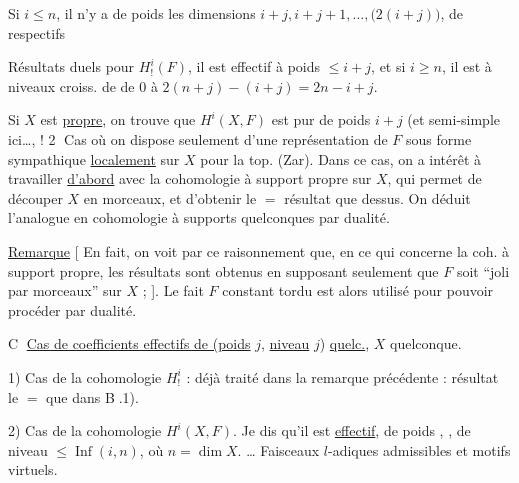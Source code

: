 Si $i\le n$, il n'y a de poids  les dimensions $i+j,i+j+1,\ldots,\bigl(2(i+j)\bigr)$, de   respectifs  

Résultats duels pour $H^i_!(F)$, il est effectif à poids $\le i+j$, et  si $i\ge n$, il est à niveaux croiss. de de $0$ à  $2(n+j)-(i+j)=2n-i+j$. 

Si $X$ est \uline{propre}, on trouve que $H^i(X,F)$ est pur de poids $i+j$ (et semi-simple ici\ldots, !
\textcircled{2} Cas où on dispose seulement d'une représentation de $F$ sous forme sympathique \uline{localement} sur $X$ pour la top. (Zar). Dans ce cas, 
on a intérêt à travailler \uline{d'abord} avec la cohomologie à support propre sur $X$, qui permet de découper $X$ en morceaux, et d'obtenir le $=$ résultat que dessus. On déduit l'analogue en cohomologie à supports quelconques par dualité.

\uline{Remarque} [ En fait, on voit par ce raisonnement que, en ce qui concerne la coh. à support propre, les résultats sont obtenus en supposant seulement que $F$ soit \textquotedblleft joli par morceaux\textquotedblright{} sur $X$ ;  ]. Le fait $F$ constant tordu  est alors utilisé  pour pouvoir procéder par dualité.

\textcircled{C} \uline{Cas de coefficients effectifs de (poids} $j$, \uline{niveau} $j$) \uline{quelc.}, $X$ quelconque.

1) Cas de la cohomologie $H^i_!$ : déjà traité dans la remarque précédente : résultat le $=$ que dans \textcircled{B}.1).

2) Cas de la cohomologie $H^i(X,F)$. Je dis qu'il est \uline{effectif}, de poids , , de niveau $\le\operatorname{Inf}(i,n)$, où $n=\dim X$.  \ldots
{}
Faisceaux $l$-adiques admissibles et motifs virtuels.

